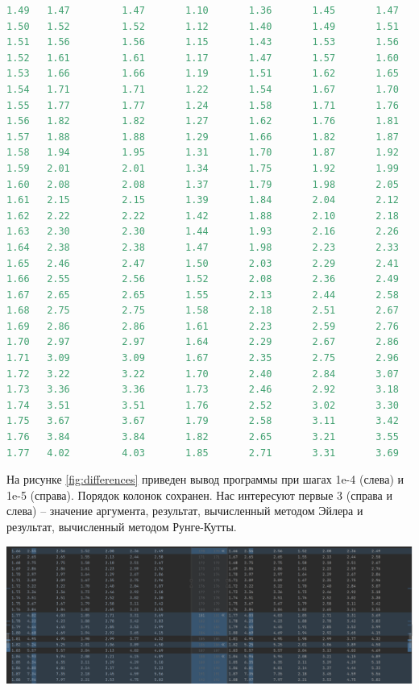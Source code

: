 \documentclass[12pt]{report}
\begin{document}
\begin{lstlisting}[language=Python]
1.49   1.47         1.47       1.10       1.36       1.45       1.47
1.50   1.52         1.52       1.12       1.40       1.49       1.51
1.51   1.56         1.56       1.15       1.43       1.53       1.56
1.52   1.61         1.61       1.17       1.47       1.57       1.60
1.53   1.66         1.66       1.19       1.51       1.62       1.65
1.54   1.71         1.71       1.22       1.54       1.67       1.70
1.55   1.77         1.77       1.24       1.58       1.71       1.76
1.56   1.82         1.82       1.27       1.62       1.76       1.81
1.57   1.88         1.88       1.29       1.66       1.82       1.87
1.58   1.94         1.95       1.31       1.70       1.87       1.92
1.59   2.01         2.01       1.34       1.75       1.92       1.99
1.60   2.08         2.08       1.37       1.79       1.98       2.05
1.61   2.15         2.15       1.39       1.84       2.04       2.12
1.62   2.22         2.22       1.42       1.88       2.10       2.18
1.63   2.30         2.30       1.44       1.93       2.16       2.26
1.64   2.38         2.38       1.47       1.98       2.23       2.33
1.65   2.46         2.47       1.50       2.03       2.29       2.41
1.66   2.55         2.56       1.52       2.08       2.36       2.49
1.67   2.65         2.65       1.55       2.13       2.44       2.58
1.68   2.75         2.75       1.58       2.18       2.51       2.67
1.69   2.86         2.86       1.61       2.23       2.59       2.76
1.70   2.97         2.97       1.64       2.29       2.67       2.86
1.71   3.09         3.09       1.67       2.35       2.75       2.96
1.72   3.22         3.22       1.70       2.40       2.84       3.07
1.73   3.36         3.36       1.73       2.46       2.92       3.18
1.74   3.51         3.51       1.76       2.52       3.02       3.30
1.75   3.67         3.67       1.79       2.58       3.11       3.42
1.76   3.84         3.84       1.82       2.65       3.21       3.55
1.77   4.02         4.03       1.85       2.71       3.31       3.69
\end{lstlisting}

На рисунке \ref{fig:differences} приведен вывод программы при шагах 1e-4 (слева) и 1e-5 (справа). Порядок колонок сохранен. Нас интересуют первые 3 (справа и слева) -- значение аргумента, результат, вычисленный методом Эйлера и результат, вычисленный методом Рунге-Кутты.

\includegraphics[scale=0.45]{img/differences}\label{fig:differences}
\end{document}
